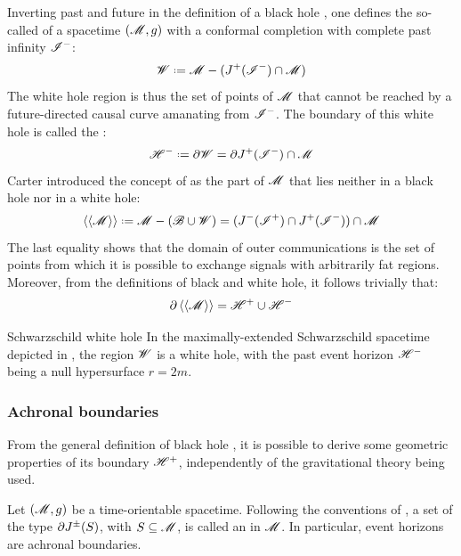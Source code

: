 Inverting past and future in the definition of a black hole , one defines the so-called  of a spacetime $ (\mathscr{M} , g) $ with a conformal completion with complete past infinity $ \mathscr{I}^- $:
\begin{equation}
  \wh \defeq\man - (J^+(\scri^-) \cap \man)
\end{equation}
The white hole region is thus the set of points of $ \mathscr{M} $ that cannot be reached by a future-directed causal curve amanating from $ \mathscr{I}^- $. The boundary of this white hole is called the :
\begin{equation}
  \eh^- \defeq \pa \wh = \pa J^+(\scri^-) \cap \man
\end{equation}
Carter \cite{carter} introduced the concept of  as the part of $ \mathscr{M} $ that lies neither in a black hole nor in a white hole:
\begin{equation}
  \doc{\man} \defeq \man - (\bh \cup \wh) = (J^-(\scri^+) \cap J^+(\scri^-)) \cap \man
\end{equation}
The last equality shows that the domain of outer communications is the set of points from which it is possible to exchange signals with arbitrarily fat regions. Moreover, from the definitions of black and white hole, it follows trivially that:
\begin{equation}
  \partial \braket{\braket{\mathscr{M}}} = \mathscr{H}^+ \cup \mathscr{H}^-
\end{equation}

\begin{example}{Schwarzschild white hole}{}
  In the maximally-extended Schwarzschild spacetime depicted in , the region $ \mathscr{W} $ is a white hole, with the past event horizon $ \mathscr{H}^- $ being a null hypersurface $ r = 2m $.
\end{example}

\subsubsection{Achronal boundaries}


From the general definition of black hole , it is possible to derive some geometric properties of its boundary $ \mathscr{H}^+ $, independently of the gravitational theory being used.

Let $ (\mathscr{M} , g) $ be a time-orientable spacetime. Following the conventions of \cite{hawking-hellis}, a set of the type $ \partial J^\pm(S) $, with $ S \subseteq \mathscr{M} $, is called an  in $ \mathscr{M} $. In particular, event horizons are achronal boundaries.


